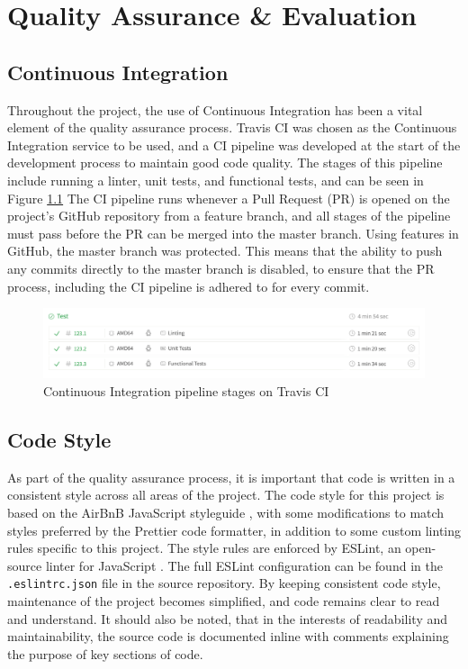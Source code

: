 \chapter{Quality Assurance \& Evaluation}


\section{Continuous Integration}
Throughout the project, the use of Continuous Integration has been a vital element of the quality assurance process. Travis CI \cite{travis-ci} was chosen as the Continuous Integration service to be used, and a CI pipeline was developed at the start of the development process to maintain good code quality. The stages of this pipeline include running a linter, unit tests, and functional tests, and can be seen in Figure \ref{fig:ci-pipeline} The CI pipeline runs whenever a Pull Request (PR) is opened on the project's GitHub repository from a feature branch, and all stages of the pipeline must pass before the PR can be merged into the master branch. Using features in GitHub, the master branch was protected. This means that the ability to push any commits directly to the master branch is disabled, to ensure that the PR process, including the CI pipeline is adhered to for every commit.

\begin{figure}[h!]
  \centering
  \includegraphics[width=\textwidth]{images/ci-pipeline.png}
  \caption{Continuous Integration pipeline stages on Travis CI}
  \label{fig:ci-pipeline}
\end{figure}

\section{Code Style}
As part of the quality assurance process, it is important that code is written in a consistent style across all areas of the project. The code style for this project is based on the AirBnB JavaScript styleguide \cite{airbnb-style}, with some modifications to match styles preferred by the Prettier code formatter, in addition to some custom linting rules specific to this project. The style rules are enforced by ESLint, an open-source linter for JavaScript . The full ESLint configuration can be found in the \verb|.eslintrc.json| file in the source repository. By keeping consistent code style, maintenance of the project becomes simplified, and code remains clear to read and understand. It should also be noted, that in the interests of readability and maintainability, the source code is documented inline with comments explaining the purpose of key sections of code.

